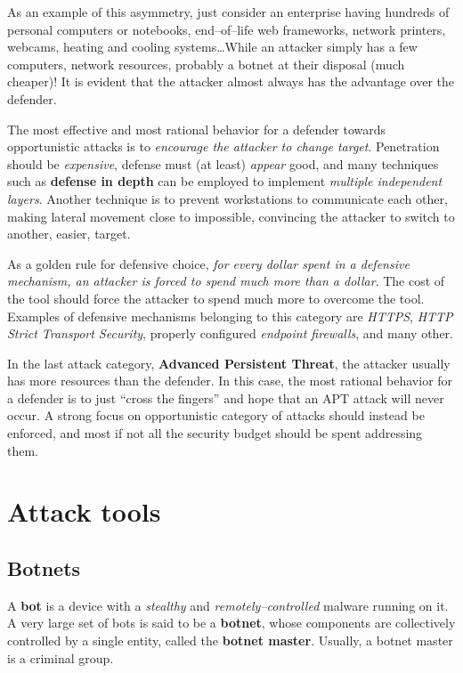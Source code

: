 \documentclass[10pt]{\classname}
\begin{document}
As an example of this asymmetry, just consider an enterprise having hundreds of
personal computers or notebooks, end--of--life web frameworks, network
printers, webcams, heating and cooling systems\dots While an attacker simply
has a few computers, network resources, probably a botnet at their disposal
(much cheaper)! It is evident that the attacker almost always has the advantage
over the defender.

The most effective and most rational behavior for a defender towards
opportunistic attacks is to \emph{encourage the attacker to change target}.
Penetration should be \emph{expensive}, defense must (at least) \emph{appear}
good, and many techniques such as \textbf{defense in depth} can be employed to
implement \emph{multiple independent layers}. Another technique is to prevent
workstations to communicate each other, making lateral movement close to
impossible, convincing the attacker to switch to another, easier, target.

As a golden rule for defensive choice, \emph{for every dollar spent in a
defensive mechanism, an attacker is forced to spend much more than a dollar}.
The cost of the tool should force the attacker to spend much more to overcome
the tool. Examples of defensive mechanisms belonging to this category are
\emph{HTTPS}, \emph{HTTP Strict Transport Security}, properly configured
\emph{endpoint firewalls}, and many other.

In the last attack category, \textbf{Advanced Persistent Threat}, the attacker
usually has more resources than the defender. In this case, the most rational
behavior for a defender is to just ``cross the fingers'' and hope that an APT
attack will never occur. A strong focus on opportunistic category of attacks
should instead be enforced, and most if not all the security budget should be
spent addressing them.

\chapter{Attack tools}

\section{Botnets}

A \textbf{bot} is a device with a \emph{stealthy} and
\emph{remotely--controlled} malware running on it. A very large set of bots is
said to be a \textbf{botnet}, whose components are collectively controlled by a
single entity, called the \textbf{botnet master}. Usually, a botnet master is a
criminal group.
\end{document}
